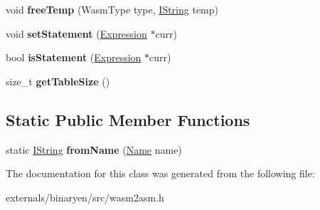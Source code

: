 \begin{DoxyCompactItemize}
\item 
\mbox{\label{classwasm_1_1_wasm2_asm_builder_a42fa431d363b5741266a3eb8ccfc5388}} 
void {\bfseries free\+Temp} (Wasm\+Type type, \mbox{\hyperlink{structcashew_1_1_i_string}{I\+String}} temp)
\item 
\mbox{\label{classwasm_1_1_wasm2_asm_builder_a5bd9129432b8d22c7edf3a6734dd2abb}} 
void {\bfseries set\+Statement} (\mbox{\hyperlink{classwasm_1_1_expression}{Expression}} $\ast$curr)
\item 
\mbox{\label{classwasm_1_1_wasm2_asm_builder_ade6d5b9a0653f3cb07d933cddda80774}} 
bool {\bfseries is\+Statement} (\mbox{\hyperlink{classwasm_1_1_expression}{Expression}} $\ast$curr)
\item 
\mbox{\label{classwasm_1_1_wasm2_asm_builder_a962ea4cc286a292b84106eaaaf4e3a9c}} 
size\+\_\+t {\bfseries get\+Table\+Size} ()
\end{DoxyCompactItemize}
\subsection*{Static Public Member Functions}
\begin{DoxyCompactItemize}
\item 
\mbox{\label{classwasm_1_1_wasm2_asm_builder_a30cc43c0d3177422d9692d629451ae5e}} 
static \mbox{\hyperlink{structcashew_1_1_i_string}{I\+String}} {\bfseries from\+Name} (\mbox{\hyperlink{structwasm_1_1_name}{Name}} name)
\end{DoxyCompactItemize}


The documentation for this class was generated from the following file\+:\begin{DoxyCompactItemize}
\item 
externals/binaryen/src/wasm2asm.\+h\end{DoxyCompactItemize}
